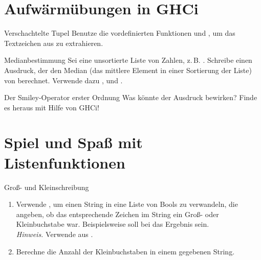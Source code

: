 \documentclass{uebblatt}
\begin{document}

\section{Aufwärmübungen in GHCi}

\begin{aufgabe}{Verschachtelte Tupel}
Benutze die vordefinierten Funktionen  und , um das Textzeichen aus  zu extrahieren.
\end{aufgabe}

\begin{aufgabe}{Medianbestimmung}
Sei  eine unsortierte Liste von Zahlen, z.\,B. . Schreibe einen Ausdruck, der den Median (das mittlere Element in einer Sortierung der Liste) von  berechnet. Verwende dazu ,  und \haskellinline{!!}.
\end{aufgabe}

\begin{aufgabe}{Der Smiley-Operator erster Ordnung}
Was könnte der Ausdruck  bewirken? Finde es heraus mit Hilfe von GHCi!
\end{aufgabe}


\section{Spiel und Spaß mit Listenfunktionen}

\begin{aufgabe}{Groß- und Kleinschreibung}
  \begin{enumerate}
    \item Verwende , um einen String in eine Liste von Bools zu verwandeln, die angeben, ob das entsprechende Zeichen im String ein Groß- oder Kleinbuchstabe war.
    Beispielsweise soll bei  das Ergebnis  sein. \\
    {\scriptsize \emph{Hinweis.} Verwende  aus .}
    \item Berechne die Anzahl der Kleinbuchstaben in einem gegebenen String.
  \end{enumerate}
\end{aufgabe}
\end{document}
